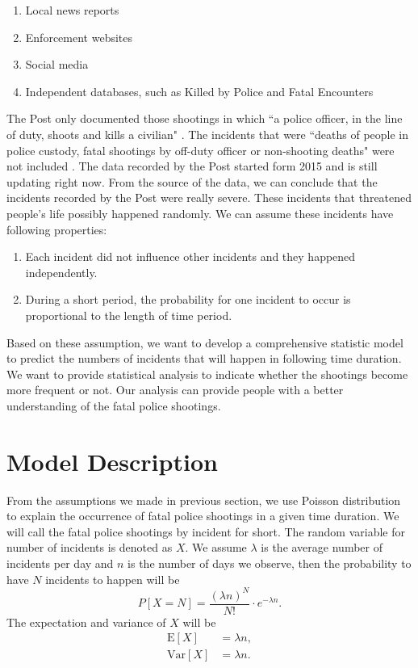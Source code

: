 \documentclass[11pt,a4paper,english]{article}
\begin{document}
\begin{enumerate}
    \item Local news reports
    \item Enforcement websites
    \item Social media
	\item Independent databases, such as Killed by Police and Fatal Encounters
\end{enumerate}

The Post only documented those shootings in which ``a police officer, in the line of duty, shoots and kills a civilian" \cite{post}. The incidents that were ``deaths of people in police custody, fatal shootings by off-duty officer or non-shooting deaths" were not included \cite{post}. The data recorded by the Post started form 2015 and is still updating right now. From the source of the data, we can conclude that the incidents recorded by the Post were really severe. These incidents that threatened people's life possibly happened randomly. We can assume these incidents have following properties:
\begin{enumerate}
    \item Each incident did not influence other incidents and they happened independently.
    \item During a short period, the probability for one incident to occur is proportional to the length of time period. 
\end{enumerate}
Based on these assumption, we want to develop a comprehensive statistic model to predict the numbers of incidents that will happen in following time duration. We want to provide statistical analysis to indicate whether the shootings become more frequent or not. Our analysis can provide people with a better understanding of the fatal police shootings.
\section{Model Description}
From the assumptions we made in previous section, we use Poisson distribution to explain the occurrence of fatal police shootings in a given time duration. 
We will call the fatal police shootings by incident for short. 
The random variable for number of incidents is denoted as $X$. 
We assume $\lambda$ is the average number of incidents per day and $n$ is the number of days we observe, then the probability to have $N$ incidents to happen will be 
\begin{equation*}
	P[X = N] = \frac{(\lambda n)^{N}}{N!} \cdot e^{-\lambda n}.
\end{equation*}
The expectation and variance of $X$ will be
\begin{align*}
	\text{E}[X] &= \lambda n, \\
	\text{Var}[X] &= \lambda n.
\end{align*}
\end{document}
